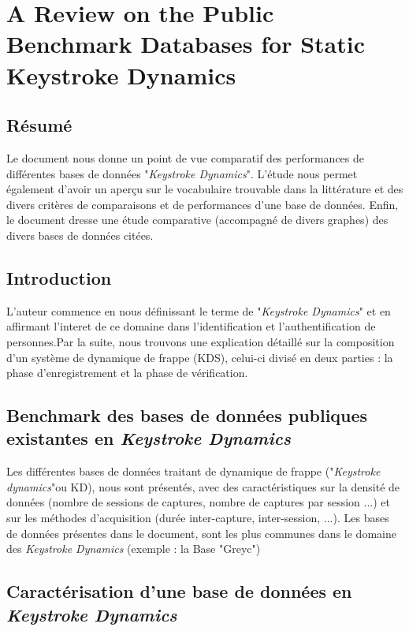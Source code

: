 \section{A Review on the Public Benchmark Databases for Static Keystroke Dynamics\cite{giotBenchmark}}

\subsection{Résumé}

Le document nous donne un point de vue comparatif des performances de différentes bases de données "\textit{Keystroke Dynamics}".    
L'étude nous permet également d'avoir un aperçu sur le vocabulaire trouvable dans la littérature et des divers critères de comparaisons et de performances d'une base de données.
Enfin, le document dresse une étude comparative (accompagné de divers graphes) des divers bases de données citées.

\subsection{Introduction}

L'auteur commence en nous définissant le terme de "\textit{Keystroke Dynamics}" et en affirmant l'interet de ce domaine dans l'identification et l'authentification de personnes.Par la suite, nous trouvons une explication détaillé sur la composition d'un système de dynamique de frappe (KDS), celui-ci divisé en deux parties : la phase d'enregistrement et la phase de vérification.

\subsection{Benchmark des bases de données publiques existantes en \textit{Keystroke Dynamics}}

Les différentes bases de données traitant de dynamique de frappe ("\textit{Keystroke dynamics}"ou  KD), nous sont présentés, avec des caractéristiques sur la densité de données (nombre de sessions de captures, nombre de captures par session ...) et sur les méthodes d'acquisition (durée inter-capture, inter-session, ...).  Les bases de données présentes dans le document, sont les plus communes dans le domaine des \textit{Keystroke Dynamics} (exemple : la Base "Greyc")

\subsection{Caractérisation d'une base de données en \textit{Keystroke Dynamics}}

